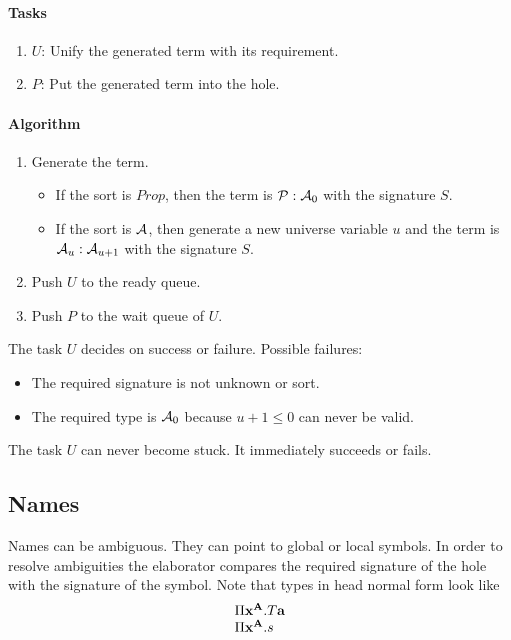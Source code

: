 \paragraph{Tasks}
\begin{enumerate}
    \item $U$: Unify the generated term with its requirement.
    \item $P$: Put the generated term into the hole.
\end{enumerate}

\paragraph{Algorithm}
\begin{enumerate}
    \item Generate the term.
        \begin{itemize}
            \item If the sort is $Prop$, then the term is ${\cal P}: {\cal A}_0$ with
                the signature $S$.
            \item If the sort is ${\cal A}$, then generate a new universe variable
                $u$ and the term is ${\cal A}_u : {\cal A}_{u+1}$ with the signature $S$.
        \end{itemize}

    \item Push $U$ to the ready queue.
    \item Push $P$ to the wait queue of $U$.
\end{enumerate}


The task $U$ decides on success or failure. Possible failures:
\begin{itemize}
    \item The required signature is not unknown or sort.
    \item The required type is ${\cal A}_0$ because $u + 1 \le 0$ can never be
        valid.
\end{itemize}

The task $U$ can never become stuck. It immediately succeeds or fails.






\subsection{Names}

Names can be ambiguous. They can point to global or local symbols. In
order to resolve ambiguities the elaborator compares the required signature of
the hole with the signature of the symbol. Note that types in head normal form
look like
$$
\begin{array}{l}
    \Pi {{\mathbf x}^{{\mathbf A}}}. T {\mathbf a}
    \\
    \Pi {{\mathbf x}^{{\mathbf A}}}. s
\end{array}
$$

